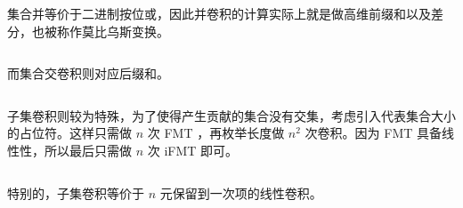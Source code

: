 集合并等价于二进制按位或，因此并卷积的计算实际上就是做高维前缀和以及差分，也被称作莫比乌斯变换。
\inputminted{cpp}{src/poly/or.cpp}
而集合交卷积则对应后缀和。
\inputminted{cpp}{src/poly/and.cpp}
子集卷积则较为特殊，为了使得产生贡献的集合没有交集，考虑引入代表集合大小的占位符。这样只需做 $n$ 次 FMT ，再枚举长度做 $n^2$ 次卷积。因为 FMT 具备线性性，所以最后只需做 $n$ 次 iFMT 即可。
\inputminted{cpp}{src/poly/linear.cpp}
特别的，子集卷积等价于 $n$ 元保留到一次项的线性卷积。